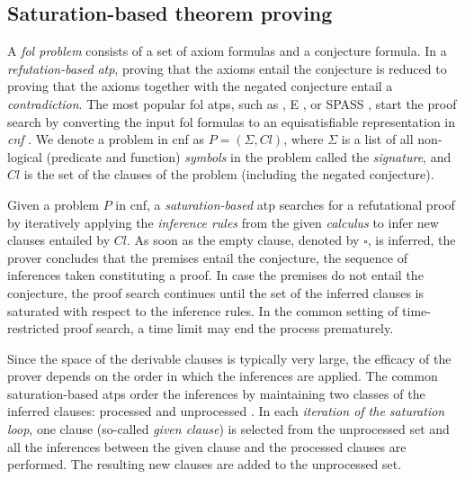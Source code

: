 
\subsection{Saturation-based theorem proving}
\label{sec:saturation}

A \emph{\acrfull{fol} problem} consists of a set of axiom formulas and a conjecture formula.
In a \emph{refutation-based} \emph{\acrfull{atp}},
proving that the axioms entail the conjecture
is reduced to proving that the axioms together with the negated conjecture entail a \emph{contradiction}.
The most popular \gls{fol} \glspl{atp}, such as \Vampire{} \cite{10.1007/978-3-642-39799-8_1}, E \cite{10.1007/978-3-030-29436-6_29}, or SPASS \cite{DBLP:conf/cade/WeidenbachDFKSW09},
start the proof search by converting the input \gls{fol} formulas to an equisatisfiable representation in 
\emph{\acrfull{cnf}} \cite{DBLP:books/el/RV01/NonnengartW01,Harrison2009}.
We denote a problem in \gls{cnf} as $P = (\Sigma, \mathit{Cl})$,
where $\Sigma$ is a list of all non-logical (predicate and function)
\emph{symbols} in the problem called the \emph{signature},
and $\mathit{Cl}$ is the set of the clauses of the problem (including the negated conjecture).

Given a problem $P$ in \gls{cnf},
a \emph{saturation-based} \gls{atp} searches for a refutational proof
by iteratively applying the \emph{inference rules} from the given \emph{calculus}
to infer new clauses entailed by $\mathit{Cl}$.
As soon as the empty clause, denoted by $\square$, is inferred,
the prover concludes that the premises entail the conjecture,
the sequence of inferences taken constituting a proof.
In case the premises do not entail the conjecture,
the proof search continues until
the set of the inferred clauses is saturated with respect to the inference rules.
In the common setting of time-restricted proof search, a time limit may end the process prematurely.

Since the space of the derivable clauses is typically very large,
the efficacy of the prover depends on the order in which the inferences are applied.
The common saturation-based \glspl{atp} order the inferences
by maintaining two classes of the inferred clauses: processed and unprocessed \cite{10.1007/978-3-030-29436-6_29}.
In each \emph{iteration of the saturation loop}, one clause (so-called \emph{given clause})
is selected from the unprocessed set
and all the inferences between the given clause and the processed clauses are performed.
The resulting new clauses are added to the unprocessed set.


